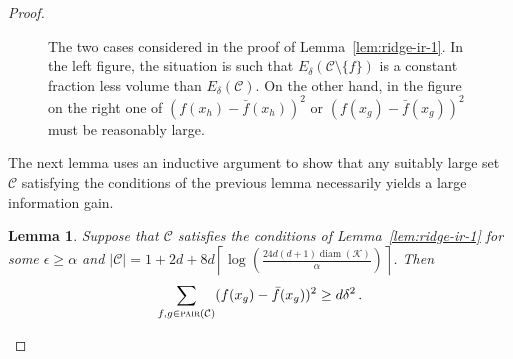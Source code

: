 \documentclass[letter, 12pt]{report}
\newcommand{\ceil}[1]{\left\lceil #1 \right\rceil}
\newcommand{\pair}{\operatorname{\textsc{pair}}}
\newcommand{\cK}{\mathcal K}
\newcommand{\cC}{\mathcal C}
\newcommand{\diam}{\operatorname{diam}}
\newcommand{\1}{\mathbf{1}}
\theoremstyle{plain}
\newtheorem{lemma}[theorem]{Lemma}
\theoremstyle{definition}
\theoremstyle{remark}
\begin{document}
\begin{proof}
\begin{figure}[h!]
\begin{tikzpicture}[scale=0.75]
        \end{tikzpicture}

        \caption{The two cases considered in the proof of Lemma~\ref{lem:ridge-ir-1}.
            In the left figure, the situation is such that $E_\delta(\cC \setminus \{f\})$ is a constant fraction less volume than $E_\delta(\cC)$.
            On the other hand, in the figure on the right one of $(f(x_h) - \bar f(x_h))^2$ or $(f(x_g) - \bar f(x_g))^2$ must be reasonably large.}
        \label{fig:ir-ridge}
    \end{figure}

    \FloatBarrier

    The next lemma uses an inductive argument to show that any suitably large set $\cC$ satisfying the conditions of the previous lemma necessarily
    yields a large information gain.

    \begin{lemma}\label{lem:ridge-ir-2}
        Suppose that $\cC$ satisfies the conditions of Lemma~\ref{lem:ridge-ir-1} for some $\epsilon \geq \alpha$ and
        $|\cC| = 1 + 2d + 8 d \ceil{\log\left(\frac{24d(d+1) \diam(\cK)}{\alpha}\right)}$. Then
        \begin{align*}
            \sum_{f,g \in \pair(\cC)} (f(x_g) - \bar f(x_g))^2 \geq d \delta^2 \,.
        \end{align*}
    \end{lemma}


\end{proof}
\end{document}

